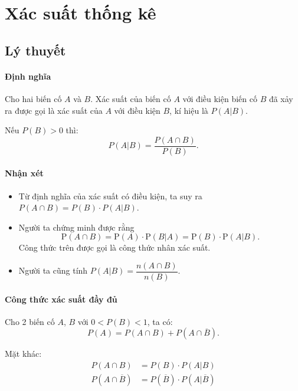 \documentclass[twoside,final]{hcmut-report}
\begin{document}
\tableofcontents\clearpage

\fancyfoot{}

\setcounter{page}{1}
\section{Xác suất thống kê}
\subsection{Lý thuyết}
\paragraph*{Định nghĩa}
Cho hai biến cố $A$ và $B$. Xác suất của biến cố $A$ với điều kiện biến cố $B$ đã xảy ra được gọi là xác suất của $A$ với điều kiện $B$, kí hiệu là $P(A | B)$.

Nếu $P(B) > 0$ thì:
\[
    P(A | B) = \frac{P(A \cap B)}{P(B)}.
\]
\paragraph*{Nhận xét}
\begin{itemize}[itemsep=0pt, topsep=0pt, parsep=0pt,label=-]
    \item Từ định nghĩa của xác suất có điều kiện, ta suy ra $P(A \cap B) = P(B) \cdot P(A | B)$.
    \item Người ta chứng minh được rằng
          \[
              \mathrm{P}(A \cap B) = \mathrm{P}(A) \cdot \mathrm{P}(B | A) = \mathrm{P}(B) \cdot \mathrm{P}(A | B).
          \]
          Công thức trên được gọi là công thức nhân xác suất.
    \item Người ta cũng tính $P(A | B) = \dfrac{n(A \cap B)}{n(B)}$.
\end{itemize}
\paragraph*{Công thức xác suất đầy đủ}
Cho 2 biến cố $A$, $B$ với $0 < P(B) < 1$, ta có:
\[
    P(A) = P(A \cap B) + P(A \cap \overline{B}).
\]

Mặt khác:
\begin{align*}
    P(A \cap B)            & = P(B) \cdot P(A | B)                       \\
    P(A \cap \overline{B}) & = P(\overline{B}) \cdot P(A | \overline{B})
\end{align*}
\end{document}
